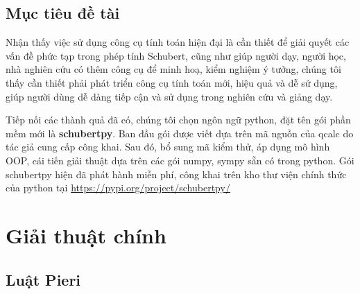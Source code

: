 \documentclass[11pt,a4paper]{book}
\begin{document}
\section{Mục tiêu đề tài}

Nhận thấy việc sử dụng công cụ tính toán hiện đại là cần thiết để giải quyết các vấn đề phức tạp trong phép tính Schubert, cũng như giúp người dạy, người học, nhà nghiên cứu có thêm công cụ để minh hoạ, kiểm nghiệm ý tưởng, chúng tôi thấy cần thiết phải phát triển công cụ tính toán mới, hiệu quả và dễ sử dụng, giúp người dùng dễ dàng tiếp cận và sử dụng trong nghiên cứu và giảng dạy. 

Tiếp nối các thành quả đã có, chúng tôi chọn ngôn ngữ python, đặt tên gói phần mềm mới là \textbf{schubertpy}. Ban đầu gói được viết dựa trên mã nguồn của qcalc do tác giả cung cấp công khai. Sau đó, bổ sung mã kiểm thử, áp dụng mô hình OOP, cái tiến giải thuật dựa trên các gói numpy, sympy sẵn có trong python. Gói schubertpy hiện đã phát hành miễn phí, công khai trên kho thư viện chính thức của python tại \href{https://pypi.org/project/schubertpy/}{https://pypi.org/project/schubertpy/}

\chapter{Giải thuật chính}
\section{Luật Pieri}
\end{document}
